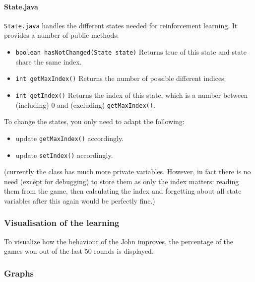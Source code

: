 \documentclass[a4paper,10pt]{scrartcl}
\begin{document}
\paragraph{State.java}
\verb|State.java| handles the different states needed for reinforcement learning. It provides a number of public methods:
\begin{itemize}
 \item \verb|boolean hasNotChanged(State state)| Returns true of this state and state share the same index.
 \item \verb|int getMaxIndex()| Returns the number of possible different indices.
 \item \verb|int getIndex()| Returns the index of this state, which is a number between (including) 0 and (excluding) \verb|getMaxIndex()|.
\end{itemize} 

To change the states, you only need to adapt the following:
\begin{itemize}
 \item update \verb|getMaxIndex()| accordingly.
 \item update \verb|setIndex()| accordingly.
\end{itemize}

(currently the class has much more private variables. However, in fact there is no need (except for debugging) to store them as only the index matters: reading them from the game, then calculating the index and forgetting about all state variables after this again would be perfectly fine.)

\subsubsection{Visualisation of the learning}
To visualize how the behaviour of the John improves, the percentage of the games won out of the last 50 rounds is displayed.


\subsubsection{Graphs}

\begin{figure}[htp]
\centering
\caption{}\label{fig:randomness_90_ogres_2}
\end{figure}

\begin{figure}[htp]
\centering
\caption{}\label{fig:randomness_99_ogres_2}
\end{figure}
\end{document}
